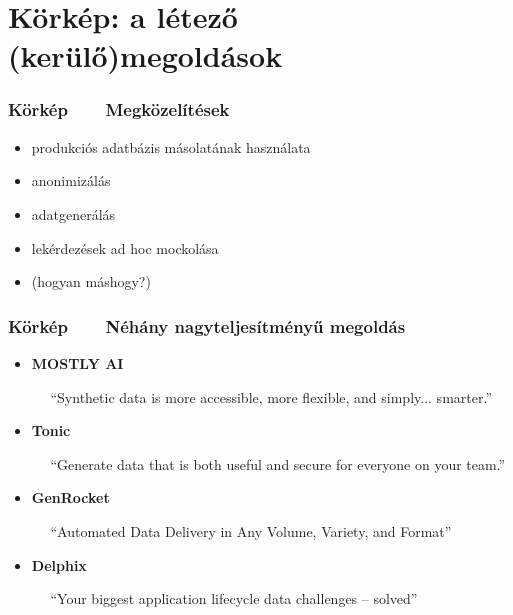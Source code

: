 \documentclass[
]{beamer}
\newcommand{\slidetitle}[2]{\frametitle{{\small #1 ~ \ding{226} ~ } \normalsize \textbf{#2} }}
\begin{document}
\section{Körkép: a létező (kerülő)megoldások}
\def\sectionshorttitle{Körkép}

\begin{frame}
    \slidetitle{\sectionshorttitle}{Megközelítések}
    
    
    \begin{itemize}
        \setlength\itemsep{1em}
        \item produkciós adatbázis másolatának használata
        \item anonimizálás
        \item adatgenerálás
        \item lekérdezések ad hoc mockolása
        \item (hogyan máshogy?)
    \end{itemize}
\end{frame}

\begin{frame}
    \slidetitle{\sectionshorttitle}{Néhány nagyteljesítményű megoldás}
    
    
    \begin{itemize}
        \setlength\itemsep{1.3em}
        \item \textbf{MOSTLY AI} \par ~~ { \footnotesize
              ``Synthetic data is more accessible, more flexible, and simply... smarter.'' }
        \item \textbf{Tonic} \par ~~ { \footnotesize
              ``Generate data that is both useful and secure for everyone on your team.'' }
        \item \textbf{GenRocket} \par ~~ { \footnotesize
              ``Automated Data Delivery in Any Volume, Variety, and Format'' }
        \item \textbf{Delphix} \par ~~ { \footnotesize
              ``Your biggest application lifecycle data challenges -- solved'' }
    \end{itemize}
\end{frame}
\end{document}

